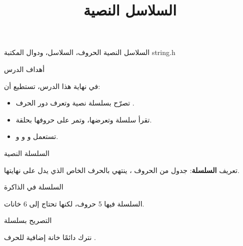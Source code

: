 \documentclass[aspectratio=169, 11pt, t, xcolor={table}]{beamer}
\title{السلاسل النصية}
\begin{document}
{السلاسل النصية}
{الحروف، السلاسل، ودوال المكتبة \textenglish{string.h}}

\begin{frame}{أهداف الدرس}
    \begin{tbox}{\faBullseye\quad في نهاية هذا الدرس، تستطيع أن:}
        \begin{itemize}
            \item تصرّح بسلسلة نصية وتعرف دور الحرف .
            \item تقرأ سلسلة وتعرضها، وتمر على حروفها بحلقة.
            \item تستعمل  و و و.
        \end{itemize}
    \end{tbox}
\end{frame}

\begin{frame}{السلسلة النصية}
    \begin{tbox}{\faLightbulb\quad تعريف}
        \textbf{السلسلة}: جدول من الحروف ، ينتهي بالحرف الخاص  الذي يدل على نهايتها.
    \end{tbox}
\end{frame}

\begin{frame}{السلسلة في الذاكرة}
    \vspace{0.5cm}
    \begin{center}
    \end{center}
    \vspace{0.3cm}
    السلسلة  فيها 5 حروف، لكنها تحتاج إلى 6 خانات.
\end{frame}

\begin{frame}{التصريح بسلسلة}
    \begin{center}
    \begin{minipage}{0.72\textwidth}
    \end{minipage}
    \end{center}
    \vspace{0.3cm}
    نترك دائمًا خانة إضافية للحرف .
\end{frame}
\end{document}
